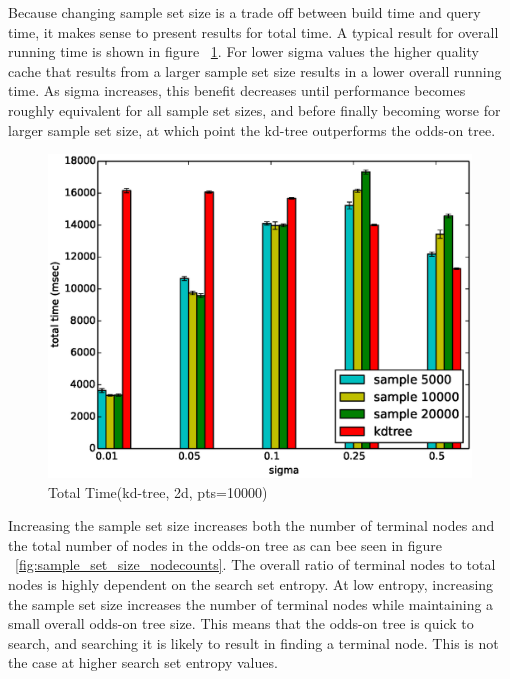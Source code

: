 \documentclass[mcs]{scsthesis}
\begin{document}
Because changing sample set size is a trade off between build time and query
time, it makes sense to present results for total time. A typical result for
overall running time is shown in figure ~\ref{fig:sample_set_size_total}. For
lower sigma values the higher quality cache that results from a larger sample
set size results in a lower overall running time. As sigma increases, this
benefit decreases until performance becomes roughly equivalent for all sample
set sizes, and before finally becoming worse for larger sample set size, at
which point the kd-tree outperforms the odds-on tree.

\begin{figure}
\begin{center}
\includegraphics[scale=0.5]{diagrams/kt_2d_pts10000_groupbysample_total.eps}
\caption{Total Time(kd-tree, 2d, pts=10000)}
\label{fig:sample_set_size_total}
\end{center}
\end{figure}

Increasing the sample set size increases both the number of terminal nodes and
the total number of nodes in the odds-on tree as can bee seen in figure
~\ref{fig:sample_set_size_nodecounts}. The overall ratio of terminal nodes to
total nodes is highly dependent on the search set entropy. At low entropy,
increasing the sample set size increases the number of terminal nodes while
maintaining a small overall odds-on tree size. This means that the odds-on
tree is quick to search, and searching it is likely to result in finding a
terminal node. This is not the case at higher search set entropy values.
\end{document}
